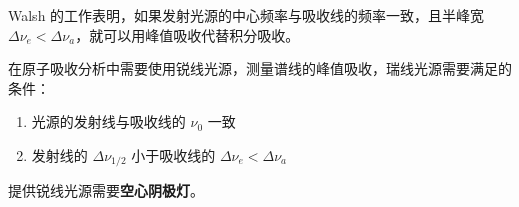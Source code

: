Walsh 的工作表明，如果发射光源的中心频率与吸收线的频率一致，且半峰宽 $\Delta
    \nu _e < \Delta \nu _a$，就可以用峰值吸收代替积分吸收。

在原子吸收分析中需要使用锐线光源，测量谱线的峰值吸收，瑞线光源需要满足的条件：

\begin{enumerate}
    \item 光源的发射线与吸收线的 $\nu_0$ 一致
    \item 发射线的 $\Delta \nu _{1/2}$
          小于吸收线的 $\Delta \nu _e < \Delta \nu _a$
\end{enumerate}


提供锐线光源需要\textbf{空心阴极灯}。

